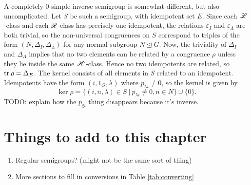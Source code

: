 A completely 0-simple inverse semigroup is somewhat different, but also
uncomplicated.  Let $S$ be such a semigroup, with idempotent set $E$.  Since
each $\mathrel{\mathscr{L}}$-class and each $\mathrel{\mathscr{R}}$-class has precisely one idempotent, the
relations $\varepsilon_I$ and $\varepsilon_\Lambda$ are both trivial, so the
non-universal congruences on $S$ correspond to triples of the form
$(N, \Delta_I, \Delta_\Lambda)$ for any normal subgroup $N \trianglelefteq G$.
Now, the triviality of $\Delta_I$ and $\Delta_\Lambda$ implies that no two
elements can be related by a congruence $\rho$ unless they lie inside the same
$\mathrel{\mathscr{H}}$-class.  Hence no two idempotents are related, so $\operatorname{tr} \rho = \Delta_E$.
The kernel consists of all elements in $S$ related to an idempotent.
Idempotents have the form $(i, 1_G, \lambda)$ where $p_{\lambda i} \neq 0$, so
the kernel is given by
$$\ker \rho = \{(i, n, \lambda) \in S ~|~ p_{\lambda i} \neq 0, n \in N\} \cup \{0\}.$$
TODO: explain how the $p_{\xi i}$ thing disappears because it's inverse.


\section{Things to add to this chapter}
\begin{enumerate}
\item Regular semigroups? (might not be the same sort of thing)
\item More sections to fill in conversions in Table \ref{tab:converting}
\end{enumerate}

